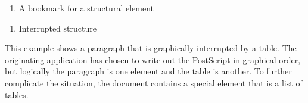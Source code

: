 \documentclass[letterpaper,12pt,english,openany,oneside]{sphinxmanual}
\begin{document}
\begin{enumerate}
%
\item {} 
A bookmark for a structural element

\end{enumerate}

\begin{sphinxVerbatim}[commandchars=\\\{\}]
 \PYG{p}{[}
   

                 
             
         
\end{sphinxVerbatim}
\begin{enumerate}
%
\item {} 
Interrupted structure

\end{enumerate}

This example shows a paragraph that is graphically interrupted by a table. The originating application has chosen to write out the PostScript in graphical order, but logically the paragraph is one element and the table is another. To further complicate the situation, the document contains a special element that is a list of tables.
\end{document}
